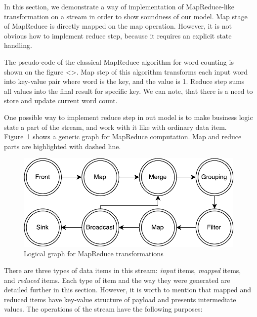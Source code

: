 
\label {fs-mapreduce}

In this section, we demonstrate a way of implementation of MapReduce-like transformation on a stream in order to show soundness of our model. Map stage of MapReduce is directly mapped on the map operation. However, it is not obvious how to implement reduce step, because it requires an explicit state handling. 

The pseudo-code of the classical MapReduce algorithm for word counting is shown on the figure <>. Map step of this algorithm transforms each input word into key-value pair where word is the key, and the value is 1. Reduce step sums all values into the final result for specific key. We can note, that there is a need to store and update current word count.

One possible way to implement reduce step in out model is to make business logic state a part of the stream, and work with it like with ordinary data item. Figure~\ref{mapreduce-graph-figure} shows a generic graph for MapReduce computation. Map and reduce parts are highlighted with dashed line.

\begin{figure}[htb]
  \centering
  \includegraphics[scale=0.5]{pics/mapreduce}
  \caption{Logical graph for MapReduce transformations}
  \label {mapreduce-graph-figure}
\end{figure}

There are three types of data items in this stream: {\it input} items, {\it mapped} items, and {\it reduced} items. Each type of item and the way they were generated are detailed further in this section. However, it is worth to mention that mapped and reduced items have key-value structure of payload and presents intermediate values. The operations of the stream have the following purposes:

